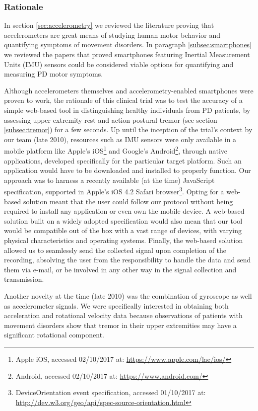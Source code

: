\subsubsection{Rationale}
\label{subsubsec:smartCT1Rationale}
In section \ref{sec:accelerometry} we reviewed the literature proving that accelerometers are great means of studying human motor behavior and quantifying symptoms of movement disorders. In paragraph \ref{subsec:smartphones} we reviewed the papers that proved smartphones featuring Inertial Measurement Units (\gls{IMU}) sensors could be considered viable options for quantifying and measuring \gls{PD} motor symptoms.

Although accelerometers themselves and accelerometry-enabled smartphones were proven to work, the rationale of this clinical trial was to test the accuracy of a simple web-based tool in distinguishing healthy individuals from \gls{PD} patients, by assessing upper extremity rest and action postural tremor (see section \ref{subsec:tremor}) for a few seconds. Up until the inception of the trial's context by our team (late 2010), resources such as IMU sensors were only available in a mobile platform like Apple's iOS\footnote{Apple iOS, accessed 02/10/2017 at: \url{https://www.apple.com/lae/ios/}} and Google's Android\footnote{Android, accessed 02/10/2017 at: \url{https://www.android.com/}}, through native applications, developed specifically for the particular target platform. Such an application would have to be downloaded and installed to properly function. Our approach was to harness a recently available (at the time) JavaScript specification, supported in Apple's iOS 4.2 Safari browser\footnote{DeviceOrientation event specification, accessed 01/10/2017 at: \url{http://dev.w3.org/geo/api/spec-source-orientation.html}}. Opting for a web-based solution meant that the user could follow our protocol without being required to install any application or even own the mobile device. A web-based solution built on a widely adopted specification would also mean that our tool would be compatible out of the box with a vast range of devices, with varying physical characteristics and operating systems. Finally, the web-based solution allowed us to seamlessly send the collected signal upon completion of the recording, absolving the user from the responsibility to handle the data and send them via e-mail, or be involved in any other way in the signal collection and transmission. 

Another novelty at the time (late 2010) was the combination of gyroscope as well as accelerometer signals. We were specifically interested in obtaining both acceleration and rotational velocity data because observations of patients with movement disorders show that tremor in their upper extremities may have a significant rotational component.

